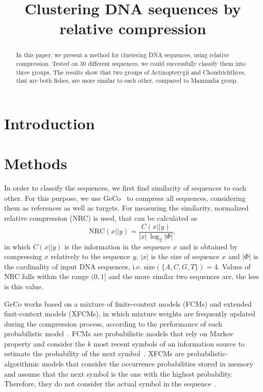 \documentclass[extendedabs]{recpad2k}
\title{Clustering DNA sequences by relative compression}
\begin{document}
\maketitle

\begin{abstract}
   In this paper, we present a method for clustering DNA sequences, using relative compression. Tested on 30 different sequences, we could successfully classify them into three groups. The results show that two groups of Actinopterygii and Chondrichthyes, that are both fishes, are more similar to each other, compared to Mammalia group.
\end{abstract}

\section{Introduction}


\section{Methods}
In order to classify the sequences, we first find similarity of sequences to each other. For this purpose, we use GeCo~\cite{pratas2016efficient} to compress all sequences, considering them as references as well as targets. For measuring the similarity, normalized relative compression (NRC) is used, that can be calculated as~\cite{pratas2018comparison}
\begin{equation}
   \mathrm{NRC} (x||y) = \frac{C (x||y)}{|x|\, \log_2 |\Phi|},
\end{equation}
in which $C (x||y)$ is the information in the sequence $x$ and is obtained by compressing $x$ relatively to the sequence $y$, $|x|$ is the size of sequence $x$ and $|\Phi|$ is the cardinality of input DNA sequences, i.e. $ \mathrm{size}(\{A, C, G, T\}) = 4 $. Values of NRC falls within the range $(0, 1]$ and the more similar two sequences are, the less is this value.

GeCo works based on a mixture of finite-context models (FCMs) and extended finit-context models (XFCMs), in which mixture weights are frequently updated during the compression process, according to the performance of each probabilistic model~\cite{pratas2016efficient}. FCMs are probabilistic models that rely on Markov property and consider the $k$ most recent symbols of an information source to estimate the probability of the next symbol~\cite{hosseini2019ac}. XFCMs are probabilistic-algorithmic models that consider the occurrence probabilities stored in memory and assume that the next symbol is the one with the highest probability. Therefore, they do not consider the actual symbol in the sequence~\cite{pratas2017substitutional}.  
\end{document}
